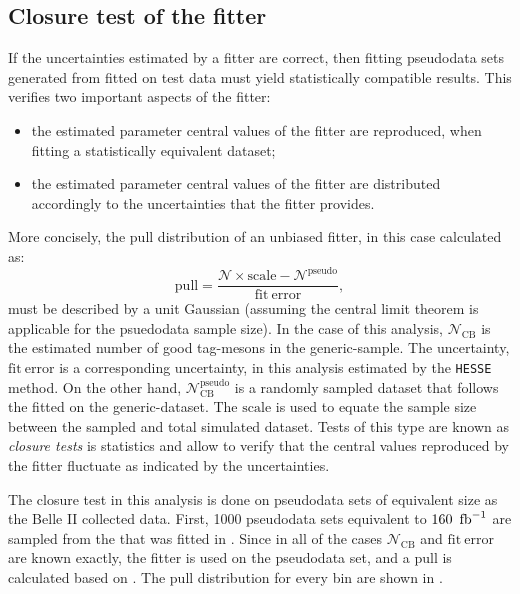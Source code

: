 \subsection{Closure test of the \texorpdfstring{\Mbc}{Mbc} fitter}\label{sec:closure_test}

If the uncertainties estimated by a fitter are correct, then fitting pseudodata sets generated from  fitted on test data must yield statistically compatible results.
This verifies two important aspects of the fitter:
\begin{itemize}
    \item the estimated parameter central values of the fitter are reproduced, when fitting a statistically equivalent dataset;
    \item the estimated parameter central values of the fitter are distributed accordingly to the uncertainties that the fitter provides.
\end{itemize}

More concisely, the pull distribution of an unbiased fitter, in this case calculated as:
\begin{equation}\label{eq:toy_pull}
    \mathrm{pull} = \frac{\mathcal{N}\times \mathrm{scale} - \mathcal{N}^{\mathrm{pseudo}}}{\mathrm{fit~error}},
\end{equation}
must be described by a unit Gaussian (assuming the central limit theorem is applicable for the psuedodata sample size).
In the case of this analysis, $\mathcal{N}_{\mathrm{CB}}$ is the estimated number of good tag-\B mesons in the generic-\MC sample.
The uncertainty, $\mathrm{fit~error}$ is a corresponding uncertainty, in this analysis estimated by the \texttt{HESSE} method.
On the other hand, $\mathcal{N}^{\mathrm{pseudo}}_{\mathrm{CB}}$ is a randomly sampled dataset that follows the  fitted on the generic-\MC dataset.
The $\mathrm{scale}$ is used to equate the sample size between the sampled and total simulated dataset.
Tests of this type are known as \textit{closure tests} is statistics and allow to verify that the central values reproduced by the fitter fluctuate as indicated by the \PDF uncertainties.

The closure test in this analysis is done on pseudodata sets of equivalent size as the Belle II collected data.
First, 1000 pseudodata sets equivalent to $\mathrm{160~\mbox{\,fb}^{-1}}$ are sampled from the \PDF that was fitted in .
Since in all of the cases $\mathcal{N}_{\mathrm{CB}}$ and $\mathrm{fit~error}$ are known exactly, the \Mbc fitter is used on the pseudodata set, and a $\mathrm{pull}$ is calculated based on .
The pull distribution for every \EB bin are shown in .

